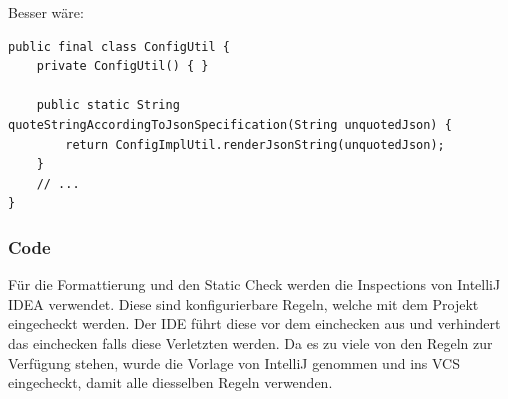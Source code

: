 Besser wäre:
\begin{lstlisting}
public final class ConfigUtil {
    private ConfigUtil() { }

    public static String quoteStringAccordingToJsonSpecification(String unquotedJson) {
        return ConfigImplUtil.renderJsonString(unquotedJson);
    }
    // ...
}
\end{lstlisting}

\subsubsection{Code}
Für die Formattierung und den Static Check werden die Inspections von IntelliJ IDEA verwendet.
Diese sind konfigurierbare Regeln, welche mit dem Projekt eingecheckt werden. Der IDE führt diese vor dem einchecken aus und verhindert das einchecken falls diese Verletzten werden.
Da es zu viele von den Regeln zur Verfügung stehen, wurde die Vorlage von IntelliJ genommen und ins VCS eingecheckt, damit alle diesselben Regeln verwenden.



